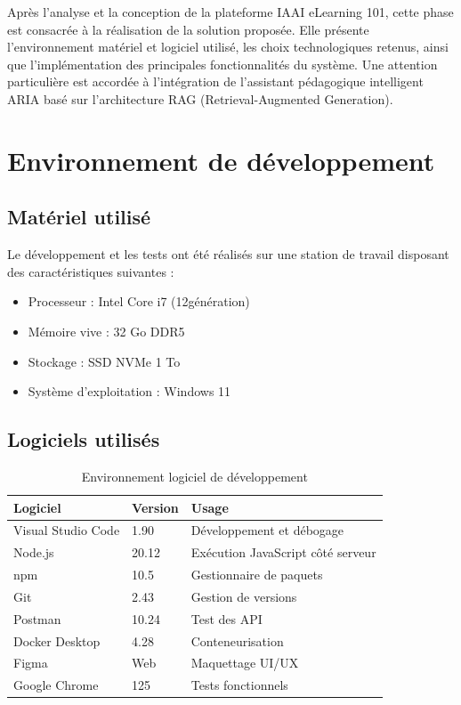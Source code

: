 \documentclass[12pt, a4paper]{report}
\begin{document}
Après l'analyse et la conception de la plateforme IAAI eLearning 101, cette phase
est consacrée à la réalisation de la solution proposée. Elle présente
l'environnement matériel et logiciel utilisé, les choix technologiques retenus,
ainsi que l'implémentation des principales fonctionnalités du système.
Une attention particulière est accordée à l'intégration de l'assistant
pédagogique intelligent ARIA basé sur l'architecture RAG
(Retrieval-Augmented Generation).

\section{Environnement de développement}

\subsection{Matériel utilisé}

Le développement et les tests ont été réalisés sur une station de travail
disposant des caractéristiques suivantes :

\begin{itemize}
    \item Processeur : Intel Core i7 (12\ieme génération)
    \item Mémoire vive : 32 Go DDR5
    \item Stockage : SSD NVMe 1 To
    \item Système d'exploitation : Windows 11
\end{itemize}

\subsection{Logiciels utilisés}

\begin{table}[H]
\centering
\caption{Environnement logiciel de développement}
\label{tab:env_logiciel}
\begin{tabular}{|l|l|p{6cm}|}
\hline
\textbf{Logiciel} & \textbf{Version} & \textbf{Usage} \\
\hline
Visual Studio Code & 1.90 & Développement et débogage \\
\hline
Node.js & 20.12 & Exécution JavaScript côté serveur \\
\hline
npm & 10.5 & Gestionnaire de paquets \\
\hline
Git & 2.43 & Gestion de versions \\
\hline
Postman & 10.24 & Test des API \\
\hline
Docker Desktop & 4.28 & Conteneurisation \\
\hline
Figma & Web & Maquettage UI/UX \\
\hline
Google Chrome & 125 & Tests fonctionnels \\
\hline
\end{tabular}
\end{table}
\end{document}
